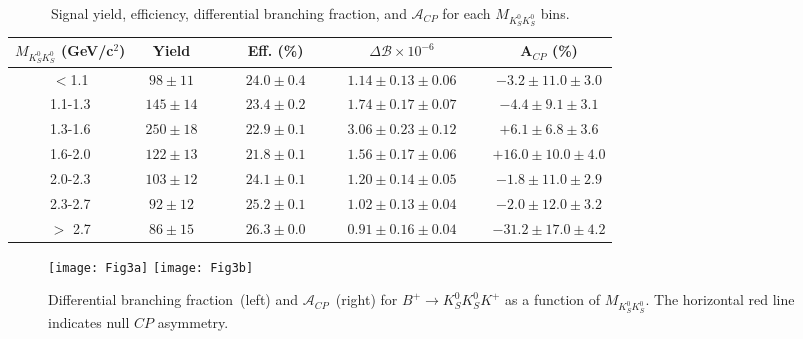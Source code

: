 \documentclass[aps,prl,preprint,tightenlines,superscriptaddress,,amsmath,byrevtex]{revtex4}
\def\KS     {\ensuremath{K^0_{\scriptscriptstyle S}}\xspace}
\newcommand{\mkk}{\ensuremath{M_{K_{S}^{0}K_{S}^{0}}}\xspace}
\def\to{\ensuremath{\rightarrow}\xspace}
\def\CP {\ensuremath{C\!P}\xspace}
\def\ACP{{\ensuremath{\mathcal{A}_{\CP}}\xspace}}
\begin{document}
\begin{table}[H]
\caption{Signal yield, efficiency, differential branching fraction, and $\ACP$ for each $\mkk$ bins. }
\label{tab:binfit}
\begin{center}
\begin{tabular}{c c c c c c c c}
\hline\hline
 $\mkk$ (GeV/c$^{2}$)&~ Yield ~& ~ & ~Eff. (\%)~  & ~ & ~$\Delta \mathcal{B} \times 10^{-6}$~ & ~&~ A$_{\CP}$ (\%) ~ \\   
 \hline 
 
  $<$1.1&  $98 \pm 11$  & &  $24.0 \pm 0.4$& &$1.14 \pm 0.13 \pm 0.06$& &$-3.2 \pm 11.0 \pm 3.0$ \\

  1.1-1.3 &  $145 \pm 14$ & & $23.4 \pm 0.2$ & &$1.74 \pm 0.17 \pm 0.07$ & &$-4.4 \pm 9.1 \pm 3.1$  \\
   
  1.3-1.6 &  $250 \pm 18$  & &$22.9 \pm 0.1$ & &$3.06 \pm 0.23 \pm 0.12$ & &$+6.1 \pm 6.8 \pm 3.6$  \\

  1.6-2.0 &  $122 \pm 13$  & &$21.8 \pm 0.1$ & & $1.56 \pm 0.17 \pm 0.06$& &$+16.0 \pm 10.0 \pm 4.0$  \\
 
  2.0-2.3 &  $103 \pm 12$  & &  $24.1 \pm 0.1$& &$1.20 \pm 0.14 \pm 0.05$ & &$-1.8 \pm 11.0 \pm 2.9$  \\
  
  2.3-2.7 &  $92 \pm 12$  & &$25.2 \pm 0.1$ & & $1.02 \pm 0.13 \pm 0.04$ & &$-2.0 \pm 12.0 \pm 3.2$  \\
  
  $>$ 2.7 &  $86 \pm 15$  & & $26.3 \pm 0.0$ & &$0.91 \pm 0.16 \pm 0.04$ & &$-31.2 \pm 17.0 \pm 4.2$\\
   
\hline
\end{tabular}
\end{center}
\end{table}

\begin{figure}[H]
\texttt{[image: Fig3a]} 
\texttt{[image: Fig3b]} \\
\caption{
Differential branching fraction~(left) and  $\ACP$~(right) for $B^{+}\to\KS\KS K^{+}$ as a function of $\mkk$. The horizontal red line indicates null $\CP$ asymmetry.}
\label{fig:binfit}
\end{figure}
 
\end{document}
